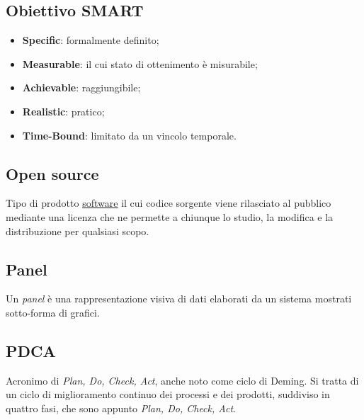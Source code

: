 	\newpage

	\subsection{Obiettivo SMART}
	\label{sec:smart}
	\begin{itemize}
			\item \textbf{Specific}: formalmente definito;
			\item \textbf{Measurable}: il cui stato di ottenimento è misurabile;
			\item \textbf{Achievable}: raggiungibile;
			\item \textbf{Realistic}: pratico;
			\item \textbf{Time-Bound}: limitato da un vincolo temporale.
		\end{itemize}



	\subsection{Open source}
	\label{sec:opensource}
	Tipo di prodotto \underline{\hyperref[sec:prodottosoftware]{software}} il cui codice sorgente viene rilasciato al pubblico mediante una licenza che ne permette a chiunque lo studio, la modifica e la distribuzione per qualsiasi scopo.


	\newpage


	\subsection{Panel}
	\label{sec:panel}
	Un \emph{panel} è una rappresentazione visiva di dati elaborati da un sistema mostrati sotto-forma di grafici.


	\subsection{PDCA}
	\label{sec:pdca}
	Acronimo di \emph{Plan, Do, Check, Act}, anche noto come ciclo di Deming. Si tratta di un ciclo di miglioramento continuo dei processi e dei prodotti, suddiviso in quattro fasi, che sono appunto \emph{Plan, Do, Check, Act}.


